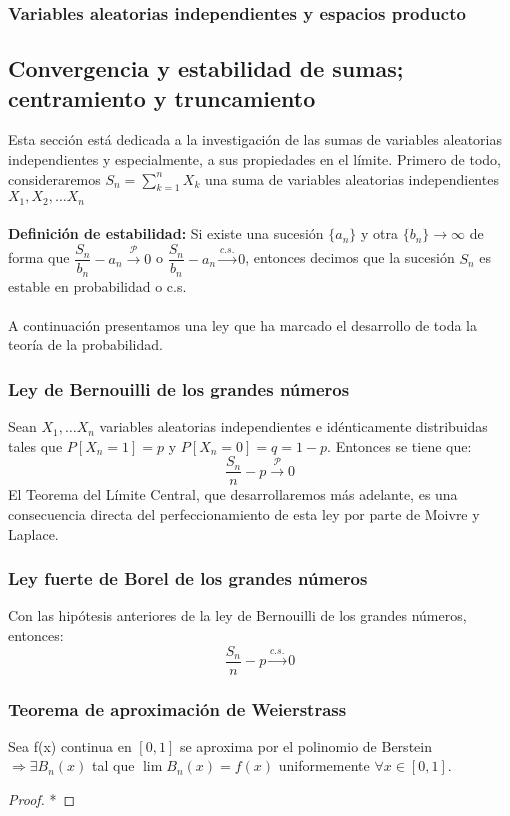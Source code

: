 \subsubsection{Variables aleatorias independientes y espacios producto}
\subsection{Convergencia y estabilidad de sumas; centramiento y truncamiento}
Esta sección está dedicada a la investigación de las sumas de variables aleatorias independientes y especialmente, a sus propiedades en el límite. Primero de todo, consideraremos $S_n=\displaystyle\sum_{k=1}^n X_k$ una suma de variables aleatorias independientes $X_1, X_2,\ldots X_n$
\\\\
\textbf{Definición de estabilidad: }Si existe una sucesión $\{a_n\}$ y otra $\{b_n\} \rightarrow \infty$ de forma que $\dfrac{S_n}{b_n}-a_n\stackrel{\mathcal{P}}{\rightarrow}0$ o $\dfrac{S_n}{b_n}-a_n\stackrel{c.s.}{\rightarrow}0$, entonces decimos que la sucesión $S_n$ es estable en probabilidad o c.s. 
\\\\
A continuación presentamos una ley que ha marcado el desarrollo de toda la teoría de la probabilidad.


\subsubsection{Ley de Bernouilli de los grandes números} %
Sean $X_1,\ldots X_n$ variables aleatorias independientes e idénticamente distribuidas tales que $P[X_n=1]=p$ y $P[X_n=0]=q=1-p$. Entonces se tiene que:
$$\dfrac{S_n}{n}-p \stackrel{\mathcal{P}}{\longrightarrow}0$$
El Teorema del Límite Central, que desarrollaremos más adelante, es una consecuencia directa del perfeccionamiento de esta ley por parte de Moivre y Laplace.

\subsubsection{Ley fuerte de Borel de los grandes números} %
Con las hipótesis anteriores de la ley de Bernouilli de los grandes números, entonces: $$\dfrac{S_n}{n}-p \stackrel{c.s.}{\longrightarrow}0$$
\subsubsection{Teorema de aproximación de Weierstrass}
\begin{theorem}
Sea f(x) continua en $[0,1]$ se aproxima por el polinomio de Berstein $\Rightarrow \exists {B_n(x)}$ tal que $\lim B_n (x) = f(x)$ uniformemente $ \forall x \in [0,1]$.
\end{theorem}
\begin{proof}*
\end{proof}
